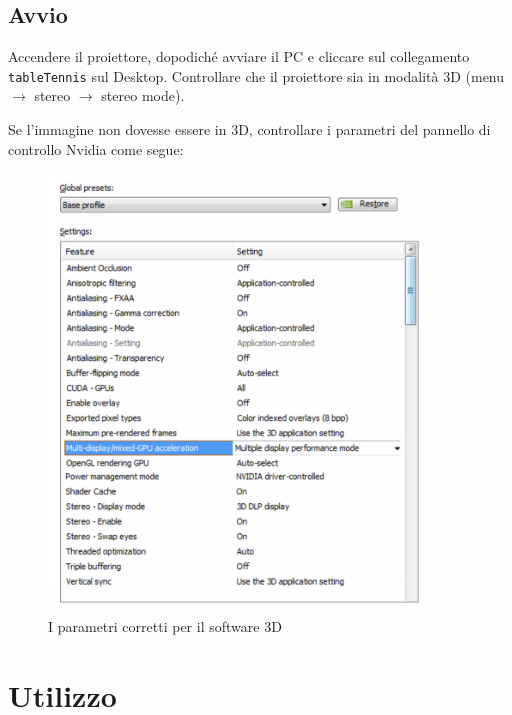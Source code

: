 \documentclass[12pt]{article}
\begin{document}
	
    
    \newpage
		
		
	\subsection{Avvio}

		Accendere il proiettore, dopodiché avviare il PC e cliccare sul collegamento
		\texttt{tableTennis} sul Desktop. Controllare che il proiettore sia in modalità 3D
		(menu $\rightarrow$ stereo $\rightarrow$ stereo mode).

		Se l'immagine non dovesse essere in 3D, controllare i parametri del pannello di controllo Nvidia
		come segue: 

		\begin{figure}[H]
			\centering
			\includegraphics[width=0.9\textwidth]{img/params.png}
			\caption*{I parametri corretti per il software 3D}
		\end{figure}
		
		
\section{Utilizzo}
\end{document}
